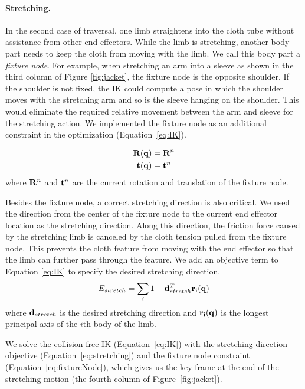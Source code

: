 \paragraph{Stretching.} In the second case of traversal, one limb straightens into the cloth tube without assistance from other end effectors. While the limb is stretching, another body part needs to keep the cloth from moving with the limb. We call this body part a \emph{fixture node}. For example, when stretching an arm into a sleeve as shown in the third column of Figure \ref{fig:jacket}, the fixture node is the opposite shoulder. If the shoulder is not fixed, the IK could compute a pose in which the shoulder moves with the stretching arm and so is the sleeve hanging on the shoulder. This would eliminate the required relative movement between the arm and sleeve for the stretching action. We implemented the fixture node as an additional constraint in the optimization (Equation~\ref{eq:IK}).

\begin{align}
  \label{eq:fixtureNode}
  \mathbf{R}(\mathbf{q})& = \mathbf{R}^n\\
  \nonumber  \mathbf{t}(\mathbf{q})& = \mathbf{t}^n
\end{align}
where $\mathbf{R}^n$ and $\mathbf{t}^n$ are the current rotation and translation of the fixture node. 

Besides the fixture node, a correct stretching direction is also critical. We used the direction from the center of the fixture node to the current end effector location as the stretching direction. Along this direction, the friction force caused by the stretching limb is canceled by the cloth tension pulled from the fixture node. This prevents the cloth feature from moving with the end effector so that the limb can further pass through the feature. We add an objective term to Equation \ref{eq:IK} to specify the desired stretching direction.
\begin{equation}
  E_{stretch} = \sum_i1 - \mathbf{d}_{stretch}^T\mathbf{r_i(q)}
  \label{eq:stretching}
\end{equation}
where $\mathbf{d}_{stretch}$ is the desired stretching direction and $\mathbf{r_i(q)}$ is the longest principal axis of the $i$th body of the limb.

We solve the collision-free IK (Equation~\ref{eq:IK}) with the stretching direction objective (Equation~\ref{eq:stretching}) and the fixture node constraint (Equation~\ref{eq:fixtureNode}), which gives us the key frame at the end of the stretching motion (the fourth column of Figure~\ref{fig:jacket}).

